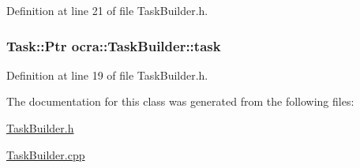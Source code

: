 Definition at line 21 of file Task\+Builder.\+h.

\subsubsection[{\texorpdfstring{task}{task}}]{\setlength{\rightskip}{0pt plus 5cm}Task\+::\+Ptr ocra\+::\+Task\+Builder\+::task\hspace{0.3cm}{\ttfamily [protected]}}\hypertarget{classocra_1_1TaskBuilder_ad3f099d23545d5d55d55ac2cf3d93b4d}{}\label{classocra_1_1TaskBuilder_ad3f099d23545d5d55d55ac2cf3d93b4d}


Definition at line 19 of file Task\+Builder.\+h.



The documentation for this class was generated from the following files\+:\begin{DoxyCompactItemize}
\item 
\hyperlink{TaskBuilder_8h}{Task\+Builder.\+h}\item 
\hyperlink{TaskBuilder_8cpp}{Task\+Builder.\+cpp}\end{DoxyCompactItemize}
